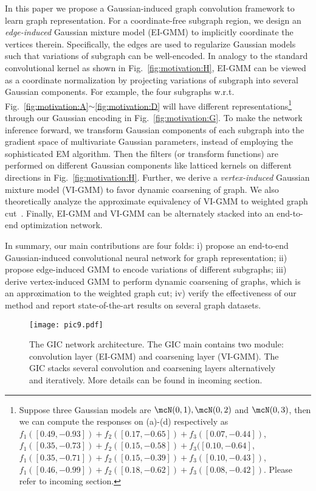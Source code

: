 \documentclass[letterpaper]{article} \usepackage{aaai19}  \usepackage{times}  \usepackage{helvet}  \usepackage{courier}  \usepackage{url}  \usepackage{graphicx}  \frenchspacing  \setlength{\pdfpagewidth}{8.5in}  \setlength{\pdfpageheight}{11in}
\begin{document}
In this paper we propose a Gaussian-induced graph convolution framework to learn graph representation. For a coordinate-free subgraph region, we design an \textit{edge-induced} Gaussian mixture model (EI-GMM) to implicitly coordinate the vertices therein. Specifically, the edges are used to regularize Gaussian models such that variations of subgraph can be well-encoded. In analogy to the standard convolutional kernel as shown in Fig.~\ref{fig:motivation:H}, EI-GMM can be viewed as a coordinate normalization by projecting variations of subgraph into several Gaussian components. For example, the four subgraphs w.r.t. Fig.~\ref{fig:motivation:A}$\sim$\ref{fig:motivation:D} will have different representations\footnote{Suppose three Gaussian models are $\mcN(0,1), \mcN(0,2)$ and $\mcN(0,3)$, then we can compute the responses on (a)-(d) respectively as $f_1([0.49, -0.93])+f_2([0.17, -0.65])+f_3([0.07, -0.44])$, $f_1([0.35, -0.73])+f_2([0.15, -0.58])+f_3([0.10, -0.64]$, $f_1([0.35, -0.71])+f_2([0.15, -0.39])+f_3([0.10, -0.43])$, $f_1([0.46, -0.99])+f_2([0.18, -0.62])+f_3([0.08, -0.42])$. Please refer to incoming section.} through our Gaussian encoding in Fig.~\ref{fig:motivation:G}. To make the network inference forward, we transform Gaussian components of each subgraph into the gradient space of multivariate Gaussian parameters, instead of employing the sophisticated EM algorithm. Then the filters (or transform functions) are performed on different Gaussian components like latticed kernels on different directions in Fig.~\ref{fig:motivation:H}. Further, we derive a \textit{vertex-induced} Gaussian mixture model (VI-GMM) to favor dynamic coarsening of graph. We also theoretically analyze the approximate equivalency of VI-GMM to weighted graph cut~\cite{dhillon2007weighted}. Finally, EI-GMM and VI-GMM can be alternately stacked into an end-to-end optimization network.

In summary, our main contributions are four folds: i) propose an end-to-end Gaussian-induced convolutional neural network for graph representation; ii) propose edge-induced GMM to encode variations of different subgraphs; iii) derive vertex-induced GMM to perform dynamic coarsening of graphs, which is an approximation to the weighted graph cut; iv) verify the effectiveness of our method and report state-of-the-art results on several graph datasets.

\begin{figure*}[t]
	\centering
	\texttt{[image: pic9.pdf]}
	\caption{The GIC network architecture. The GIC main contains two module: convolution layer (EI-GMM) and coarsening layer (VI-GMM). The GIC stacks several convolution and coarsening layers alternatively and iteratively. More details can be found in incoming section.}
	\label{fig:network:A}
\end{figure*}
\end{document}
